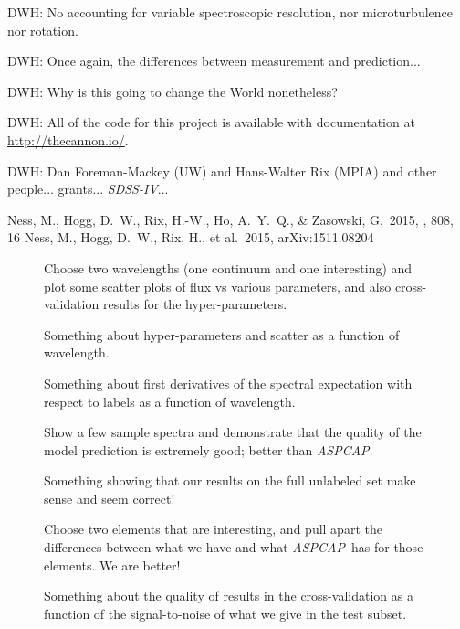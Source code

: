 \documentclass[12pt,preprint]{aastex}
\newcommand{\project}[1]{\textsl{#1}}
\newcommand{\acronym}[1]{{\small{#1}}}
\newcommand{\sdss}{\project{\acronym{SDSS-IV}}}
\newcommand{\aspcap}{\project{\acronym{ASPCAP}}}
\begin{document}
DWH: No accounting for variable spectroscopic resolution, nor
microturbulence nor rotation.

DWH:  Once again, the differences between measurement and prediction...

DWH:  Why is this going to change the World nonetheless?

DWH: All of the code for this project is available with documentation
at \url{http://thecannon.io/}.

\acknowledgements
DWH: Dan Foreman-Mackey (UW) and Hans-Walter Rix (MPIA) and other people...
grants...
\sdss...

\begin{thebibliography}{dummy}\raggedright
{} Ness, M., Hogg, D.~W., 
Rix, H.-W., Ho, A.~Y.~Q., \& Zasowski, G.\ 2015, \apj, 808, 16
 Ness, M., Hogg, D.~W., 
Rix, H., et al.\ 2015, arXiv:1511.08204 
\end{thebibliography}

\clearpage

\begin{figure}[p]
\caption{Choose two wavelengths (one continuum and one interesting)
  and plot some scatter plots of flux vs various parameters, and also
  cross-validation results for the
  hyper-parameters.\label{fig:onewavelength}}
\end{figure}

\begin{figure}[p]
\caption{Something about hyper-parameters and scatter as a function of
  wavelength.\label{fig:hyperpars}}
\end{figure}

\begin{figure}[p]
\caption{Something about first derivatives of the spectral expectation
  with respect to labels as a function of
  wavelength.\label{fig:derivatives}}
\end{figure}

\begin{figure}[p]
\caption{Show a few sample spectra and demonstrate that the quality of
  the model prediction is extremely good; better than
  \aspcap.\label{fig:correctness}}
\end{figure}

\begin{figure}[p]
\caption{Something showing that our results on the full unlabeled set
  make sense and seem correct!\label{fig:fulltest}}
\end{figure}

\begin{figure}[p]
\caption{Choose two elements that are interesting, and pull apart the
  differences between what we have and what \aspcap\ has for those
  elements.  We are better!\label{fig:elements}}
\end{figure}

\begin{figure}[p]
\caption{Something about the quality of results in the
  cross-validation as a function of the signal-to-noise of what we
  give in the test subset.\label{fig:snr}}
\end{figure}
\end{document}
